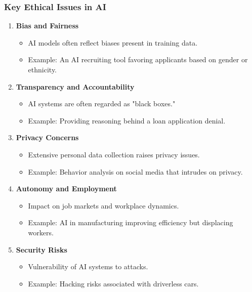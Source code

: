 \documentclass[aspectratio=169]{beamer}
\begin{document}
\begin{frame}[fragile]
    \frametitle{Key Ethical Issues in AI}
    \begin{enumerate}
        \item \textbf{Bias and Fairness}
        \begin{itemize}
            \item AI models often reflect biases present in training data.
            \item Example: An AI recruiting tool favoring applicants based on gender or ethnicity.
        \end{itemize}
        
        \item \textbf{Transparency and Accountability}
        \begin{itemize}
            \item AI systems are often regarded as "black boxes."
            \item Example: Providing reasoning behind a loan application denial.
        \end{itemize}
        
        \item \textbf{Privacy Concerns}
        \begin{itemize}
            \item Extensive personal data collection raises privacy issues.
            \item Example: Behavior analysis on social media that intrudes on privacy.
        \end{itemize}
        
        \item \textbf{Autonomy and Employment}
        \begin{itemize}
            \item Impact on job markets and workplace dynamics.
            \item Example: AI in manufacturing improving efficiency but displacing workers.
        \end{itemize}
        
        \item \textbf{Security Risks}
        \begin{itemize}
            \item Vulnerability of AI systems to attacks.
            \item Example: Hacking risks associated with driverless cars.
        \end{itemize}
    \end{enumerate}
\end{frame}
\end{document}
